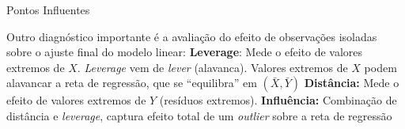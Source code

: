 \documentclass{beamer}\usepackage[]{graphicx}\usepackage[]{color}
\begin{document}
\begin{frame}{Pontos Influentes}

Outro diagnóstico importante é a avaliação do efeito de observações isoladas sobre o ajuste final do modelo linear: \pause
\vfill
\textbf{Leverage}: Mede o efeito de valores extremos de $X$. \emph{Leverage} vem de \emph{lever} (alavanca). Valores extremos de $X$ podem alavancar a reta de regressão, que se ``equilibra'' em $(\bar{X},\bar{Y})$ 
\pause
\vfill
\textbf{Distância:} Mede o efeito de valores extremos de $Y$ (resíduos extremos). \pause
\vfill
\textbf{Influência:} Combinação de distância e \emph{leverage}, captura efeito total de um \emph{outlier} sobre a reta de regressão

\end{frame}
\end{document}
